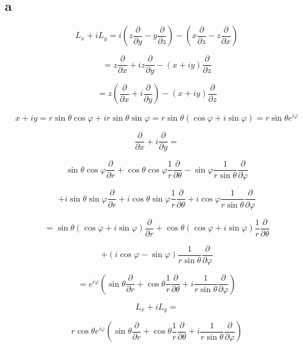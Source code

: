 \documentclass[12pt]{article}
\begin{document}
\subsection{a}

\[
    L_x
    + i L_y = i \left(z \frac{\partial}{\partial y} - y \frac{\partial}{\partial z}\right)
    - \left(x \frac{\partial}{\partial z} - z \frac{\partial}{\partial x}\right)
\]

\[
    = z \frac{\partial}{\partial x} + i z \frac{\partial}{\partial y} - \left(x + i y\right)  \frac{\partial}{\partial z}
\]

\[
    = z \left(\frac{\partial}{\partial x} + i \frac{\partial}{\partial y}\right)  - \left(x + i y\right)
    \frac{\partial}{\partial z}
\]

\[
    x + i y = r \sin{\theta} \cos{\varphi} + i r \sin{\theta} \sin{\varphi} = r \sin{\theta}
    \left(\cos{\varphi} + i \sin{\varphi}\right) = r \sin{\theta} e^{i \varphi}
\]

\[
    \frac{\partial}{\partial x} + i \frac{\partial}{\partial y} =
\]

\[
    \sin{\theta} \cos{\varphi} \frac{\partial}{\partial r}
    + \cos{\theta} \cos{\varphi} \frac{1}{r} \frac{\partial}{\partial \theta}
    - \sin{\varphi} \frac{1}{r \sin{\theta}} \frac{\partial}{\partial \varphi}
\]

\[
    + i  \sin{\theta} \sin{\varphi} \frac{\partial}{\partial r}
    + i \cos{\theta} \sin{\varphi} \frac{1}{r} \frac{\partial}{\partial \theta}
    + i \cos{\varphi} \frac{1}{r \sin{\theta}} \frac{\partial}{\partial \varphi}
\]

\[
    = \sin{\theta} \left(\cos{\varphi} + i \sin{\varphi}\right) \frac{\partial}{\partial r}
    + \cos{\theta} \left(\cos{\varphi} + i \sin{\varphi}\right) \frac{1}{r} \frac{\partial}{\partial \theta}
\]

\[
    + \left(i \cos{\varphi} - \sin{\varphi}\right)  \frac{1}{r \sin{\theta}} \frac{\partial}{\partial \varphi}
\]

\[
    = e^{i \varphi}
    \left(
    \sin{\theta} \frac{\partial}{\partial r}+ \cos{\theta} \frac{1}{r} \frac{\partial}{\partial \theta}
    + i \frac{1}{r \sin{\theta}} \frac{\partial}{\partial \varphi}
    \right)
\]

\[
    L_x + i L_y =
\]

\[
    r \cos{\theta} e^{i \varphi}
    \left(
    \sin{\theta} \frac{\partial}{\partial r}
    + \cos{\theta} \frac{1}{r} \frac{\partial}{\partial \theta}
    + i \frac{1}{r \sin{\theta}} \frac{\partial}{\partial \varphi}
    \right)
\]
\end{document}
